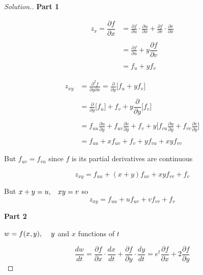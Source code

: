 \documentclass[11pt,a4paper]{article}
\theoremstyle{definition}
\newenvironment{solution}
  {\renewcommand{\qedsymbol}{}\begin{proof}[\textit{Solution}.]}
  {\end{proof}}
\newcommand{\subhead}[1]{%
  \par\medskip\noindent\textbf{#1}\par\nobreak\smallskip}
\begin{document}
\begin{solution}
\subhead{Part 1}
\begin{align*}
z_x = \dfrac{\partial f}{\partial x} & =  \frac{\partial f}{\partial u}\cdot\frac{\partial u}{\partial x} + \frac{\partial f}{\partial v}\cdot\frac{\partial v}{\partial x}\\\\
& = \frac{\partial f}{\partial u} + y\dfrac{\partial f}{\partial v}\\\\
& = f_u + yf_v 
\end{align*}

\begin{align*}
z_{xy} & = \frac{\partial^2f}{\partial y \partial x} = \frac{\partial}{\partial y}\big[f_u + y f_v\big]\\\\
& = \frac{\partial }{\partial y}\big[f_u\big] + f_v + y \dfrac{\partial}{\partial y}\big[f_v\big]\\\\
& = f_{uu}\frac{\partial u}{\partial y} + f_{uv}\frac{\partial v}{\partial y} +f_v + y\Bigg[f_{vu}\frac{\partial u}{\partial y} + f_{vv}\frac{\partial v}{\partial y}\Bigg]\\\\
& = f_{uu} + xf_{uv} + f_v + yf_{vu} + xyf_{vv}
\end{align*}

But $f_{uv} = f_{vu}$ since $f$ is its partial derivatives are continuous

$$z_{xy} = f_{uu} + (x+y)f_{uv} + xyf_{vv} + f_v$$

But $x + y = u, \hspace{0.3cm} xy = v $ so
$$z_{xy} = f_{uu} + uf_{uv} + vf_{vv} + f_v$$

\subhead{Part 2}
$w = f(x,y),\hspace{0.4cm} y$ and $x$ functions of $t$

$$\dfrac{d w}{dt} = \dfrac{\partial f}{\partial x}\cdot \dfrac{dx}{dt} +  \dfrac{\partial f}{\partial y}\cdot \dfrac{dy}{dt} = e^t\dfrac{\partial f}{\partial x} + 2\dfrac{\partial f}{\partial y}$$


\end{solution}
\end{document}
